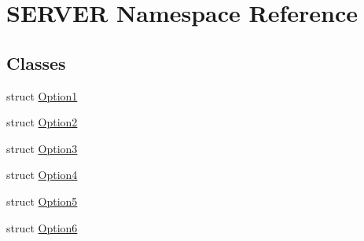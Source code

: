 \hypertarget{namespaceSERVER}{
\section{SERVER Namespace Reference}
\label{namespaceSERVER}
}


\subsection*{Classes}
\begin{CompactItemize}
\item 
struct \hyperlink{structSERVER_1_1Option1}{Option1}
\item 
struct \hyperlink{structSERVER_1_1Option2}{Option2}
\item 
struct \hyperlink{structSERVER_1_1Option3}{Option3}
\item 
struct \hyperlink{structSERVER_1_1Option4}{Option4}
\item 
struct \hyperlink{structSERVER_1_1Option5}{Option5}
\item 
struct \hyperlink{structSERVER_1_1Option6}{Option6}
\end{CompactItemize}
